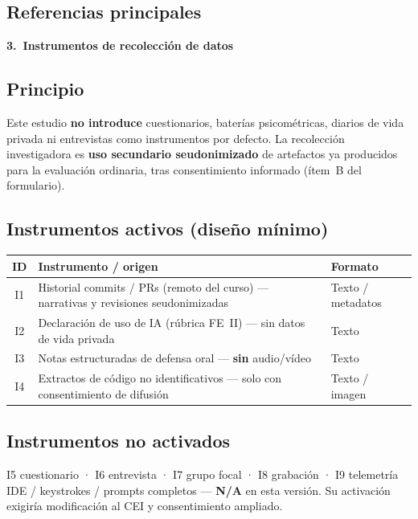\documentclass[11pt,a4paper]{scrartcl}
\newcommand{\AnnexTitle}[1]{%
  \clearpage
  \LogoRow
  \begin{center}{\Large\sffamily\bfseries #1}\end{center}
  \vspace{0.4em}
  \noindent{\color{rulegray}\hrule height 0.4pt}
  \vspace{0.5em}
}
\begin{document}
\subsection*{Referencias principales}
\ChicagoMethodsRefs

\AnnexTitle{3.\ Instrumentos de recolección de datos}

\subsection*{Principio}
Este estudio \textbf{no introduce} cuestionarios, baterías psicométricas, diarios
de vida privada ni entrevistas como instrumentos por defecto. La recolección
investigadora es \textbf{uso secundario seudonimizado} de artefactos ya producidos
para la evaluación ordinaria, tras consentimiento informado (ítem~B del formulario).

\subsection*{Instrumentos activos (diseño mínimo)}
\renewcommand{\arraystretch}{1.25}
\begin{tabularx}{\textwidth}{@{}c>{\raggedright\arraybackslash}X>{\raggedright\arraybackslash}p{3.2cm}@{}}
  \toprule
  \textbf{ID} & \textbf{Instrumento / origen} & \textbf{Formato} \\
  \midrule
  I1 & Historial commits / PRs (remoto del curso) --- narrativas y revisiones seudonimizadas & Texto / metadatos \\
  I2 & Declaración de uso de IA (rúbrica FE~II) --- sin datos de vida privada & Texto \\
  I3 & Notas estructuradas de defensa oral --- \textbf{sin} audio/vídeo & Texto \\
  I4 & Extractos de código no identificativos --- solo con consentimiento de difusión & Texto / imagen \\
  \bottomrule
\end{tabularx}

\subsection*{Instrumentos no activados}
I5 cuestionario · I6 entrevista · I7 grupo focal · I8 grabación · I9 telemetría IDE /
keystrokes / prompts completos --- \textbf{N/A} en esta versión. Su activación
exigiría modificación al CEI y consentimiento ampliado.
\end{document}
